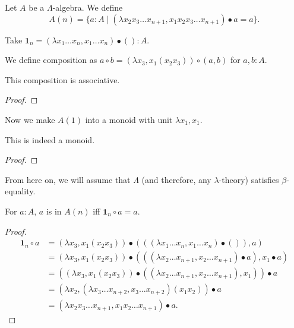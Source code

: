 \begin{definition}
  Let $ A $ be a $ \Lambda $-algebra. We define
  \[ A(n) = \{ a : A \mid (\lambda x_2 x_3 \dots x_{n + 1}, x_1 x_2 x_3 \dots x_{n + 1}) \bullet a = a \}. \]
\end{definition}

\begin{definition}
  Take $ \mathbf 1_n = (\lambda x_1 \dots x_n, x_1 \dots x_n) \bullet () : A $.
\end{definition}

\begin{definition}
  We define composition as $ a \circ b = (\lambda x_3, x_1 (x_2 x_3)) \circ (a, b) $ for $ a, b : A $.
\end{definition}

\begin{lemma}
  This composition is associative.
\end{lemma}
\begin{proof}
  \TODO
\end{proof}

\begin{definition}
  Now we make $ A(1) $ into a monoid with unit $ \lambda x_1, x_1 $.
\end{definition}

\begin{lemma}
  This is indeed a monoid.
\end{lemma}
\begin{proof}
  \TODO
\end{proof}

From here on, we will assume that $ \Lambda $ (and therefore, any $ \lambda $-theory) satisfies $ \beta $-equality.

\begin{lemma}
  For $ a: A $, $ a $ is in $ A(n) $ iff $ \mathbf 1_n \circ a = a $.
\end{lemma}
\begin{proof}
  \begin{align*}
    \mathbf 1_n \circ a
    &= (\lambda x_3, x_1 (x_2 x_3)) \bullet (((\lambda x_1 \dots x_n, x_1 \dots x_n) \bullet ()), a)\\
    &= (\lambda x_3, x_1 (x_2 x_3)) \bullet (((\lambda x_2 \dots x_{n + 1}, x_2 \dots x_{n + 1}) \bullet a), x_1 \bullet a)\\
    &= ((\lambda x_3, x_1 (x_2 x_3)) \bullet ((\lambda x_2 \dots x_{n + 1}, x_2 \dots x_{n + 1}), x_1)) \bullet a\\
    &= (\lambda x_2, (\lambda x_3 \dots x_{n + 2}, x_3 \dots x_{n + 2}) (x_1 x_2)) \bullet a\\
    &= (\lambda x_2 x_3 \dots x_{n + 1}, x_1 x_2 \dots x_{n + 1}) \bullet a.
  \end{align*}
\end{proof}

